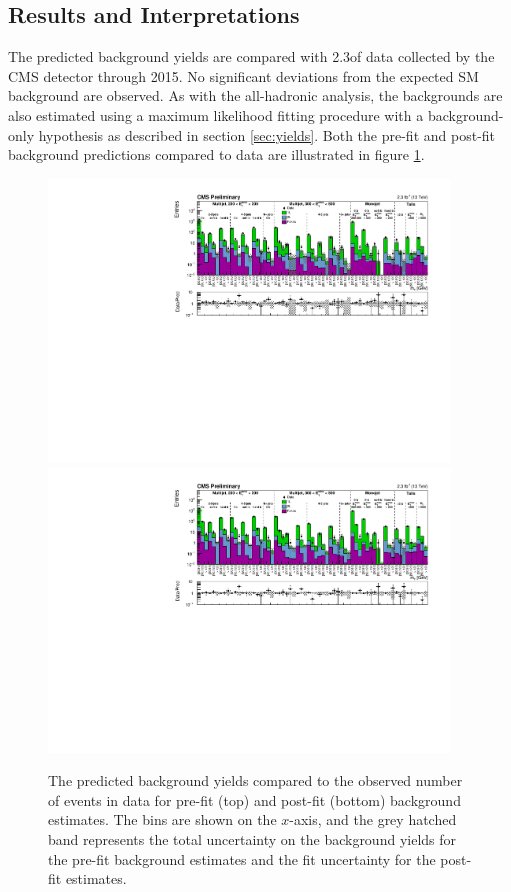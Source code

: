 \subsection{Results and Interpretations}
\label{subsec:softresults}

The predicted background yields are compared with 2.3\fbinv of data collected by the CMS detector through 2015.  No significant deviations from the expected SM background are observed. As with the all-hadronic analysis, the backgrounds are also estimated using a maximum likelihood fitting procedure with a background-only hypothesis as described in section \ref{sec:yields}. Both the pre-fit and post-fit background predictions compared to data are illustrated in figure \ref{fig:softresults}.
\begin{figure}
	\centering
	\includegraphics[width=0.95\textwidth]{soft/figs/c_DataVsPrediction_Syst_log}
	\includegraphics[width=0.95\textwidth]{soft/figs/c_DataVsPostFitEstimates_log}
	\renewcommand{\baselinestretch}{1.0}
	\caption[The predicted background yields compared to the observed number of events in data for pre-fit (top) and post-fit (bottom) background estimates.]{The predicted background yields compared to the observed number of events in data for pre-fit (top) and post-fit (bottom) background estimates. The \mt bins are shown on the $x$-axis, and the grey hatched band represents the total uncertainty on the background yields for the pre-fit background estimates and the fit uncertainty for the post-fit estimates.}
	\label{fig:softresults}
\end{figure}


